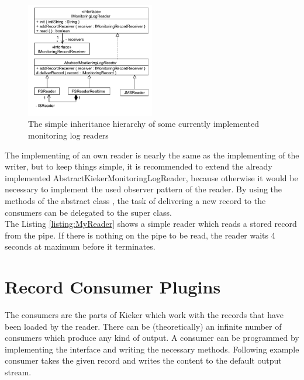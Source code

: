 		\begin{figure}[H]
			\begin{centering}
				\includegraphics[width=0.5\textwidth]{images/kieker_readerimpls}
				\caption{The simple inheritance hierarchy of some currently implemented monitoring log readers}
				\label{Figure:ReaderHierarchy}
			\end{centering}
		\end{figure}

		The implementing of an own reader is nearly the same as the implementing of the writer, but to keep things simple, it is recommended to extend the already implemented AbstractKiekerMonitoringLogReader, because otherwise it would be necessary to implement the used observer pattern of the reader. By using the methods of the abstract class , the task of delivering a new record to the consumers can be delegated to the super class.\\
		The Listing \ref{listing:MyReader} shows a simple reader which reads a stored record from the pipe. If there is nothing on the pipe to be read, the reader waits 4 seconds at maximum before it terminates.

		\setJavaCodeListing
		

	\section{Record Consumer Plugins}

		The consumers are the parts of Kieker which work with the records that have been loaded by the reader. There can be (theoretically) an infinite number of consumers which produce any kind of output. A consumer can be programmed by implementing the interface  and writing the necessary methods. Following example consumer takes the given record and writes the content to the default output stream.

